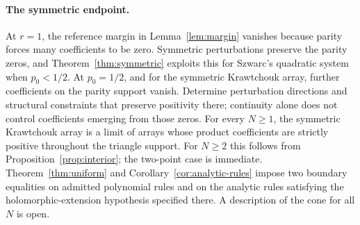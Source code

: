 \paragraph{The symmetric endpoint.}
At $r=1$, the reference margin in Lemma~\ref{lem:margin} vanishes because parity forces many coefficients to be zero. Symmetric perturbations preserve the parity zeros, and Theorem~\ref{thm:symmetric} exploits this for Szwarc's quadratic system when $p_0<1/2$. At $p_0=1/2$, and for the symmetric Krawtchouk array, further coefficients on the parity support vanish. Determine perturbation directions and structural constraints that preserve positivity there; continuity alone does not control coefficients emerging from those zeros. For every $N\geq1$, the symmetric Krawtchouk array is a limit of arrays whose product coefficients are strictly positive throughout the triangle support. For $N\geq2$ this follows from Proposition~\ref{prop:interior}; the two-point case is immediate. Theorem~\ref{thm:uniform} and Corollary~\ref{cor:analytic-rules} impose two boundary equalities on admitted polynomial rules and on the analytic rules satisfying the holomorphic-extension hypothesis specified there. A description of the cone for all $N$ is open.


